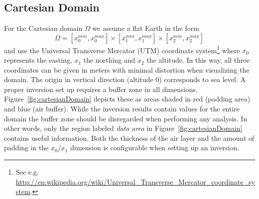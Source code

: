 \subsection{Cartesian Domain}
For the Cartesian domain $\Omega$ we assume a flat Earth in the form
\begin{equation} \label{REF:EQU:INTRO 8}
\Omega = [x^{min}_0, x^{max}_0] \times
 [x^{min}_1, x^{max}_1] \times
 [x^{min}_2, x^{max}_2] 
\end{equation} 
and use the Universal Transverse Mercator (UTM) coordinate system\footnote{See
    e.g. \url{http://en.wikipedia.org/wiki/Universal_Transverse_Mercator_coordinate_system}.}
where $x_0$ represents the easting, $x_1$ the northing and $x_2$ the altitude.
In this way, all three coordinates can be given in meters with minimal
distortion when visualizing the domain.
The origin in vertical direction (altitude 0) corresponds to sea level.
A proper inversion set up requires a buffer zone in all dimensions.
Figure~\ref{fig:cartesianDomain} depicts these as areas shaded in red (padding
area) and blue (air buffer).
While the inversion results contain values for the entire domain the buffer zone
should be disregarded when performing any analysis.
In other words, only the region labeled \emph{data area} in
Figure~\ref{fig:cartesianDomain} contains useful information.
Both the thickness of the air layer and the amount of padding in the $x_0$/$x_1$
dimension is configurable when setting up an inversion.












 
